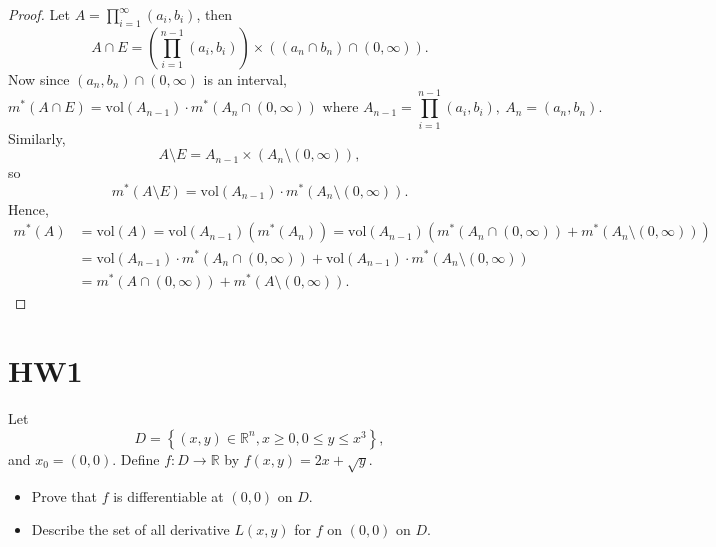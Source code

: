 \begin{proof}
    Let \(A = \prod _{i=1}^{\infty} (a_i, b_i)\), then 
    \[
        A \cap E = \left( \prod _{i=1}^{n-1} (a_i, b_i) \right) \times ((a_n \cap b_n) \cap (0, \infty)). 
    \] 
    Now since \((a_n, b_n) \cap (0, \infty)\) is an interval,  
    \[
        m^*(A \cap E) = \mathrm{vol}(A_{n-1}) \cdot m^*(A_n \cap (0, \infty)) \text{ where } A_{n-1} = \prod _{i=1}^{n-1} (a_i, b_i), \ A_n = (a_n, b_n). 
    \]
    Similarly, 
    \[
        A \setminus E = A_{n-1} \times (A_n \setminus (0, \infty)),
    \]
    so 
    \[
        m^*(A \setminus E) = \mathrm{vol}(A_{n-1}) \cdot m^*(A_n \setminus (0, \infty)).
    \]
    Hence,
    \begin{align*}
        m^*(A) &= \mathrm{vol}(A) = \mathrm{vol}(A_{n-1})(m^*(A_n))=\mathrm{vol}(A_{n-1})(m^*(A_n \cap (0, \infty)) + m^*(A_n \setminus (0, \infty))) \\
        &= \mathrm{vol}(A_{n-1}) \cdot m^*(A_n \cap (0, \infty)) + \mathrm{vol}(A_{n-1}) \cdot m^*(A_n \setminus (0, \infty)) \\
        &= m^*(A \cap (0, \infty)) + m^*(A \setminus (0, \infty)). 
    \end{align*}
\end{proof}

\section{HW1}
\begin{problem}
    Let 
    \[
        D = \left\{ (x, y) \in \mathbb{R} ^n, x \ge 0, 0 \le y \le x^3 \right\}, 
    \]
    and \(x_0 = (0, 0)\). Define \(f: D \to \mathbb{R}\) by \(f(x, y) = 2x + \sqrt{y} \). 
    \begin{itemize}
        \item [(a)] Prove that \(f\) is differentiable at \((0, 0)\) on \(D\). 
        \item [(b)] Describe the set of all derivative \(L(x, y)\) for \(f\) on \((0, 0)\) on \(D\).       
    \end{itemize}   
\end{problem}

